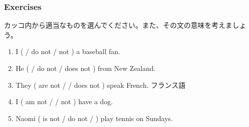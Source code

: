 \documentclass[aspectratio=169,xcolor={dvipsnames,table}]{beamer}
\begin{document}
\begin{frame}[plain]\frametitle{Exercises}
カッコ内から適当なものを選んでください。また、その文の意味を考えましょう。

\begin{enumerate}
 \item I (  / do not / not ) a baseball fan.
 \item He (   / do not  / does not ) from New Zealand.
 \item They ( are not /   / does not ) speak French.\hspace{10pt}{\footnotesize French:} {\tiny フランス語}
 \item I ( am not /  / not ) have a dog.
 \item Naomi ( is not / do not /   ) play tennis on Sundays.\hspace{10pt}{\footnotesize on Sundays:} 
\end{enumerate}




\end{frame}
\end{document}
